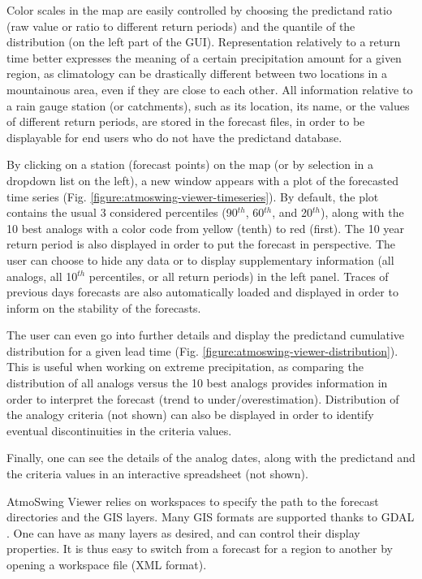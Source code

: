 \documentclass[review]{elsarticle}
\begin{document}
Color scales in the map are easily controlled by choosing the predictand ratio (raw value or ratio to different return periods) and the quantile of the distribution (on the left part of the GUI). Representation relatively to a return time better expresses the meaning of a certain precipitation amount for a given region, as climatology can be drastically different between two locations in a mountainous area, even if they are close to each other. All information relative to a rain gauge station (or catchments), such as its location, its name, or the values of different return periods, are stored in the forecast files, in order to be displayable for end users who do not have the predictand database.

By clicking on a station (forecast points) on the map (or by selection in a dropdown list on the left), a new window appears with a plot of the forecasted time series (Fig. \ref{figure:atmoswing-viewer-timeseries}). By default, the plot contains the usual 3 considered percentiles (90$^{th}$, 60$^{th}$, and 20$^{th}$), along with the 10 best analogs with a color code from yellow (tenth) to red (first). The 10 year return period is also displayed in order to put the forecast in perspective. The user can choose to hide any data or to display supplementary information (all analogs, all 10$^{th}$ percentiles, or all return periods) in the left panel. Traces of previous days forecasts are also automatically loaded and displayed in order to inform on the stability of the forecasts. 

The user can even go into further details and display the predictand cumulative distribution for a given lead time (Fig. \ref{figure:atmoswing-viewer-distribution}). This is useful when working on extreme precipitation, as comparing the distribution of all analogs versus the 10 best analogs provides information in order to interpret the forecast (trend to under/overestimation). Distribution of the analogy criteria (not shown) can also be displayed in order to identify eventual discontinuities in the criteria values.

Finally, one can see the details of the analog dates, along with the predictand and the criteria values in an interactive spreadsheet (not shown).

AtmoSwing Viewer relies on workspaces to specify the path to the forecast directories and the GIS layers. Many GIS formats are supported thanks to GDAL \cite[Geospatial Data Abstraction Library,][]{GDAL2014}. One can have as many layers as desired, and can control their display properties. It is thus easy to switch from a forecast for a region to another by opening a workspace file (XML format).
\end{document}
